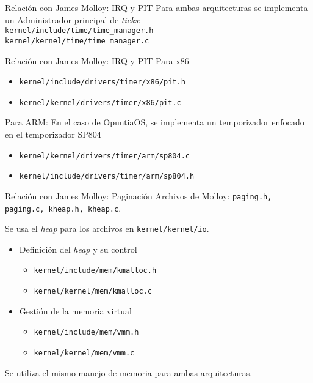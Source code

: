 \begin{frame}{Relación con James Molloy: IRQ y PIT}
	Para ambas arquitecturas se implementa un Administrador principal de \textit{ticks}:\\
	\texttt{kernel/include/time/time\_manager.h} \\
	\texttt{kernel/kernel/time/time\_manager.c}
\end{frame}

\begin{frame}{Relación con James Molloy: IRQ y PIT}
	Para x86
	\begin{itemize} \setlength\itemsep{0pt} \footnotesize
		\item \texttt{kernel/include/drivers/timer/x86/pit.h}
		\item \texttt{kernel/kernel/drivers/timer/x86/pit.c}
		
	\end{itemize}
	
	Para ARM:
	En el caso de OpuntiaOS, se implementa un temporizador enfocado en el temporizador SP804
	\begin{itemize} \setlength\itemsep{0pt} \footnotesize
		\item \texttt{kernel/kernel/drivers/timer/arm/sp804.c}
		\item \texttt{kernel/include/drivers/timer/arm/sp804.h}
	\end{itemize}
\end{frame}


\begin{frame}{Relación con James Molloy: Paginación}
	Archivos de Molloy: \texttt{paging.h, paging.c, kheap.h, kheap.c}.
	
	
	Se usa el \textit{heap} para los archivos en \texttt{kernel/kernel/io}.
	
	\begin{itemize} \setlength\itemsep{0pt} \footnotesize
		\item Definición del \textit{heap} y su control
		\begin{itemize} \setlength\itemsep{0pt}
			\item \texttt{kernel/include/mem/kmalloc.h}
			\item \texttt{kernel/kernel/mem/kmalloc.c}
		\end{itemize}
		
		\item Gestión de la memoria virtual
		\begin{itemize} \setlength\itemsep{0pt} \footnotesize
			\item \texttt{kernel/include/mem/vmm.h}
			\item \texttt{kernel/kernel/mem/vmm.c}
		\end{itemize}
		
	\end{itemize}
	
	Se utiliza el mismo manejo de memoria para ambas arquitecturas.
\end{frame}


